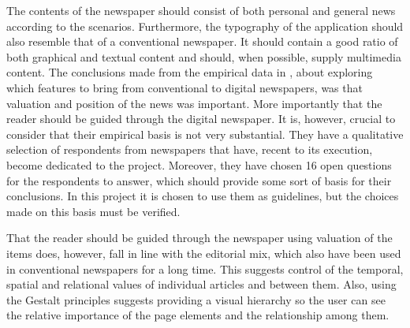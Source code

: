 The contents of the newspaper should consist of both personal and general news according to the scenarios. Furthermore, the typography of the application should also resemble that of a conventional newspaper. It should contain a good ratio of both graphical and textual content and should, when possible, supply multimedia content. The conclusions made from the empirical data in \cite{FULLTEXT01.pdf}, about exploring which features to bring from conventional to digital newspapers, was that valuation and position of the news was important. More importantly that the reader should be guided through the digital newspaper. It is, however, crucial to consider that their empirical basis is not very substantial. They have a qualitative selection of respondents from newspapers that have, recent to its execution, become dedicated to the project. Moreover, they have chosen 16 open questions for the respondents to answer, which should provide some sort of basis for their conclusions. In this project it is chosen to use them as guidelines, but the choices made on this basis must be verified\hspace{-1em}.

That the reader should be guided through the newspaper using valuation of the items does, however, fall in line with the editorial mix, which also have been used in conventional newspapers for a long time. This suggests control of the temporal, spatial and relational values of individual articles and between them. Also, using the Gestalt principles \cite{Tidwell} suggests providing a visual hierarchy so the user can see the relative importance of the page elements and the relationship among them.

